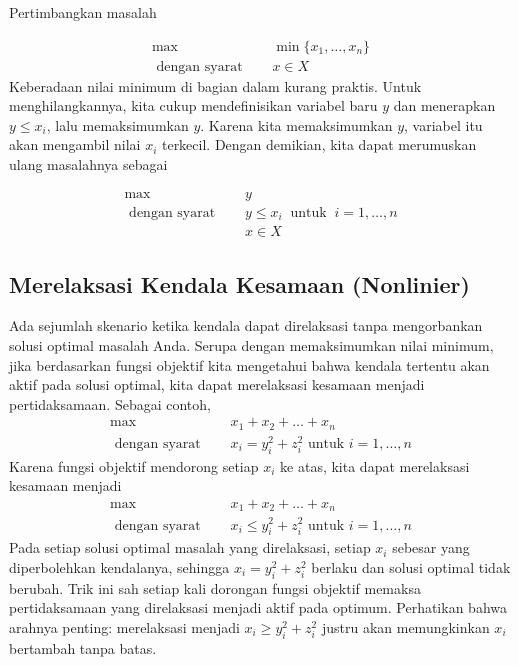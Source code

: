 Pertimbangkan masalah

\begin{align*}
\max   \quad & \min \{x_1, \dots, x_n\}\\
\text{ dengan syarat } \quad &  x \in X
\end{align*}
Keberadaan nilai minimum di bagian dalam kurang praktis. Untuk menghilangkannya, kita cukup mendefinisikan variabel baru $y$ dan menerapkan $y \leq x_i$, lalu memaksimumkan $y$. Karena kita memaksimumkan $y$, variabel itu akan mengambil nilai $x_i$ terkecil. Dengan demikian, kita dapat merumuskan ulang masalahnya sebagai

\begin{align*}
\max\quad    & y\\
\text{ dengan syarat } \quad  & y \leq x_i \ \text{ untuk }\  i=1, \dots, n \\
&  x \in X
\end{align*}


\subsection{Merelaksasi Kendala Kesamaan (Nonlinier)}

Ada sejumlah skenario ketika kendala dapat direlaksasi tanpa mengorbankan solusi optimal masalah Anda. Serupa dengan memaksimumkan nilai minimum, jika berdasarkan fungsi objektif kita mengetahui bahwa kendala tertentu akan aktif pada solusi optimal, kita dapat merelaksasi kesamaan menjadi pertidaksamaan. Sebagai contoh,
\begin{align*}
\max   \quad &x_1 + x_2 +  \dots + x_n\\
\text{ dengan syarat } \quad &  x_i = y_i^2 + z_i^2 \text{ untuk } i=1, \dots, n
\end{align*}
Karena fungsi objektif mendorong setiap $x_i$ ke atas, kita dapat merelaksasi kesamaan menjadi
\begin{align*}
\max   \quad &x_1 + x_2 +  \dots + x_n\\
\text{ dengan syarat } \quad &  x_i \leq y_i^2 + z_i^2 \text{ untuk } i=1, \dots, n
\end{align*}
Pada setiap solusi optimal masalah yang direlaksasi, setiap $x_i$ sebesar yang diperbolehkan kendalanya, sehingga $x_i = y_i^2 + z_i^2$ berlaku dan solusi optimal tidak berubah. Trik ini sah setiap kali dorongan fungsi objektif memaksa pertidaksamaan yang direlaksasi menjadi aktif pada optimum. Perhatikan bahwa arahnya penting: merelaksasi menjadi $x_i \geq y_i^2 + z_i^2$ justru akan memungkinkan $x_i$ bertambah tanpa batas.






